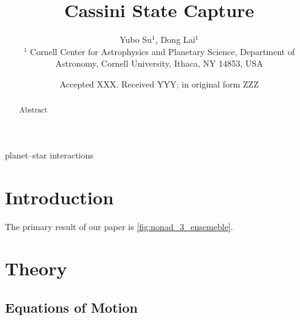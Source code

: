 \documentclass[
        fleqn,
        usenatbib,
    ]{mnras}
\title[Cassini State Capture]{Cassini State Capture}
\author[Y. Su et\ al.]{
Yubo Su$^1$,
Dong Lai$^1$
\\
$^1$ Cornell Center for Astrophysics and Planetary Science, Department of
Astronomy, Cornell University, Ithaca, NY 14853, USA
}
\date{Accepted XXX\@. Received YYY\@; in original form ZZZ}
\begin{document}
\label{firstpage}
\pagerange{\pageref{firstpage}--\pageref{lastpage}}
\renewcommand*{\sectionautorefname}{Section}
\maketitle


\begin{abstract}
    Abstract
\end{abstract}

\begin{keywords}
planet--star interactions %
\end{keywords}

\section{Introduction}

The primary result of our paper is \autoref{fig:nonad_3_ensemeble}.

\section{Theory}\label{s:eq}

\subsection{Equations of Motion}
\end{document}
